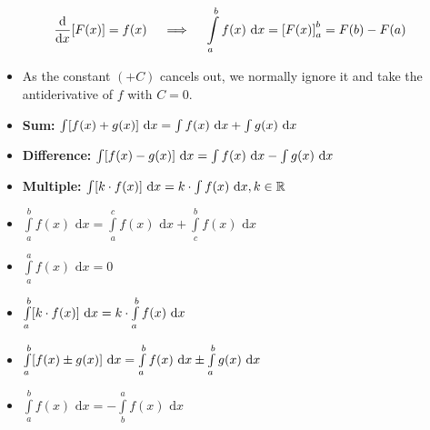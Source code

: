 \documentclass[12pt,a4paper,titlepage]{article}
\newcommand{\diff}[2][]{\frac{\text{d}#1}{\text{d}#2}}
\newcommand{\intd}[1]{\text{ d}#1}
\DeclarePairedDelimiter {\bracs} {  [      }     {  ]      }
\begin{document}
            \begin{SummaryBox}[title=The fundamental theorem of calculus]
                \[
                    \diff{x}\bracs*{F(x)} = f(x) \quad \implies \quad \int\limits^{b}_{a} f(x)\intd{x} = \bracs*{F(x)}^{b}_{a} = F(b) - F(a)
                \]
                \begin{itemize}[leftmargin=*, topsep=0pt]
                    \item As the constant $(+C)$ cancels out, we normally ignore it and take the antiderivative of $f$ with $C=0$.
                \end{itemize}
            \end{SummaryBox}
            
            \begin{SummaryBox}[title=Antidifferentiation rules]
                \begin{SummaryExtensionBox}[title=Antidifferentiation results]
                    \begin{itemize}[leftmargin=*]
                        \item \textbf{Sum:} $\int \bracs*{f(x) + g(x)}\intd{x} = \int f(x)\intd{x} + \int g(x)\intd{x}$
                        \item \textbf{Difference:} $\int \bracs*{f(x) - g(x)}\intd{x} = \int f(x)\intd{x} - \int g(x)\intd{x}$
                        \item \textbf{Multiple:} $\int \bracs*{k \cdot f(x)}\intd{x} = k \cdot \int f(x)\intd{x}, k \in \mathbb{R}$
                    \end{itemize}
                \end{SummaryExtensionBox}
                
                \begin{SummaryExtensionBox}[title=Properties of the definite integral]
                    \begin{itemize}[leftmargin=*]
                        \item $\int\limits_a^b f(x)\intd{x} = \int\limits_a^c f(x)\intd{x} + \int\limits_c^b f(x)\intd{x}$
                        \item $\int\limits_a^a f(x)\intd{x} = 0$
                        \item $\int\limits_a^b \bracs*{k \cdot f(x)}\intd{x} = k \cdot \int\limits_a^b f(x)\intd{x}$
                        \item $\int\limits_a^b \bracs*{f(x) \pm g(x)}\intd{x} = \int\limits_a^b f(x)\intd{x} \pm \int\limits_a^b g(x)\intd{x}$
                        \item $\int\limits_a^b f(x)\intd{x} = -\int\limits_b^a f(x)\intd{x}$
                    \end{itemize}
                \end{SummaryExtensionBox}
            \end{SummaryBox}
            
\end{document}
